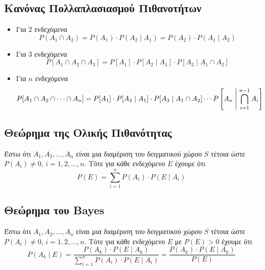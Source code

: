 \subsection*{Κανόνας Πολλαπλασιασμού Πιθανοτήτων}

\begin{itemize}
  \item Για $2$ ενδεχόμενα
\[
P(A_{1} \cap A_{2}) = P(A_{1}) \cdot P(A_{2} \mid A_{1}) = P(A_{2}) \cdot P(A_{1} \mid A_{2})
\]

\item Για $3$ ενδεχόμενα
\[
P[A_{1} \cap A_{2} \cap A_{3}] = P[A_{1}] \cdot P[A_{2} \mid A_{1}] \cdot P[A_{3} \mid A_{1} \cap A_{2}]
\]

\item Για $n$ ενδεχόμενα
\[
P[A_{1} \cap A_{2} \cap \cdots \cap A_{n}] = P[A_{1}] \cdot P[A_{2} \mid A_{1}] \cdot P[A_{3} \mid A_{1} \cap A_{2}] \cdots P\left[A_{n} \Biggm| \bigcap\limits_{i=1}^{n-1} A_{i}\right]
\]
\end{itemize}

\subsection*{Θεώρημα της Ολικής Πιθανότητας}

Έστω ότι $A_{1}, A_{2}, \ldots, A_{n}$ είναι μια διαμέριση του δειγματικού χώρου $S$ τέτοια ώστε $P(A_{i}) \neq 0$, $i = 1,2, \ldots, n$. Τότε για κάθε ενδεχόμενο $E$ έχουμε ότι
\[
P(E) = \sum_{i=1}^{n}P(A_{i}) \cdot P(E \mid A_{i})
\]

\subsection*{Θεώρημα του \textlatin{Bayes}}
Έστω ότι $A_{1}, A_{2}, \ldots, A_{n}$ είναι μια διαμέριση του δειγματικού χώρου $S$ τέτοια ώστε $P(A_{i}) \neq 0$, $i = 1,2, \ldots, n$. Τότε για κάθε ενδεχόμενο $E$ με $P(E) > 0$ έχουμε ότι
\[
P(A_{k} \mid E) = \frac{P(A_{k}) \cdot P(E \mid A_{k})}{\sum_{i=1}^{n}P(A_{i}) \cdot P(E \mid A_{i})} = \frac{P(A_{k}) \cdot P(E \mid A_{k})}{P(E)}
\]
